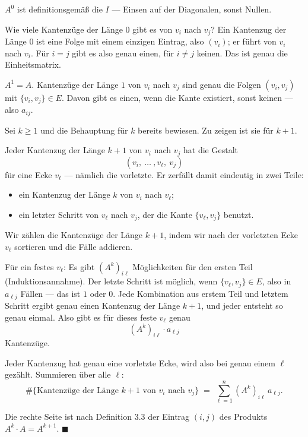 \begin{merksatz}
$A^0$ ist definitionsgemäß die  $I$ --- Einsen auf der Diagonalen, sonst Nullen.

Wie viele Kantenzüge der Länge $0$ gibt es von $v_i$ nach $v_j$? Ein Kantenzug der Länge $0$ ist eine Folge mit einem einzigen Eintrag, also $(v_i)$; er führt von $v_i$ nach $v_i$. Für $i = j$ gibt es also genau einen, für $i \neq j$ keinen. Das ist genau die Einheitsmatrix.

$A^1 = A$. Kantenzüge der Länge $1$ von $v_i$ nach $v_j$ sind genau die Folgen $(v_i, v_j)$ mit $\{v_i,v_j\} \in E$. Davon gibt es einen, wenn die Kante existiert, sonst keinen --- also $a_{ij}$.

Sei $k \ge 1$ und die Behauptung für $k$ bereits bewiesen. Zu zeigen ist sie für $k+1$.

Jeder Kantenzug der Länge $k+1$ von $v_i$ nach $v_j$ hat die Gestalt
\[ (v_i, \ \ldots \ , v_\ell, \ v_j) \]
für eine Ecke $v_\ell$ --- nämlich die vorletzte. Er zerfällt damit eindeutig in zwei Teile:
\begin{itemize}[leftmargin=1.4em, itemsep=2pt]
\item ein Kantenzug der Länge $k$ von $v_i$ nach $v_\ell$;
\item ein letzter Schritt von $v_\ell$ nach $v_j$, der die Kante $\{v_\ell, v_j\}$ benutzt.
\end{itemize}

Wir zählen die Kantenzüge der Länge $k+1$, indem wir nach der vorletzten Ecke $v_\ell$ sortieren und die Fälle addieren.

Für ein festes $v_\ell$: Es gibt $(A^k)_{i\ell}$ Möglichkeiten für den ersten Teil (Induktionsannahme). Der letzte Schritt ist möglich, wenn $\{v_\ell,v_j\} \in E$, also in $a_{\ell j}$ Fällen --- das ist $1$ oder $0$. Jede Kombination aus erstem Teil und letztem Schritt ergibt genau einen Kantenzug der Länge $k+1$, und jeder entsteht so genau einmal. Also gibt es für dieses feste $v_\ell$ genau
\[ (A^k)_{i\ell} \cdot a_{\ell j} \]
Kantenzüge.

Jeder Kantenzug hat genau eine vorletzte Ecke, wird also bei genau einem $\ell$ gezählt. Summieren über alle $\ell$:
\[ \#\{\text{Kantenzüge der Länge } k+1 \text{ von } v_i \text{ nach } v_j\} \;=\; \sum_{\ell=1}^{n} (A^k)_{i\ell}\, a_{\ell j} . \]

Die rechte Seite ist nach Definition 3.3 der Eintrag $(i,j)$ des Produkts $A^k \cdot A = A^{k+1}$. $\blacksquare$
\end{merksatz}

